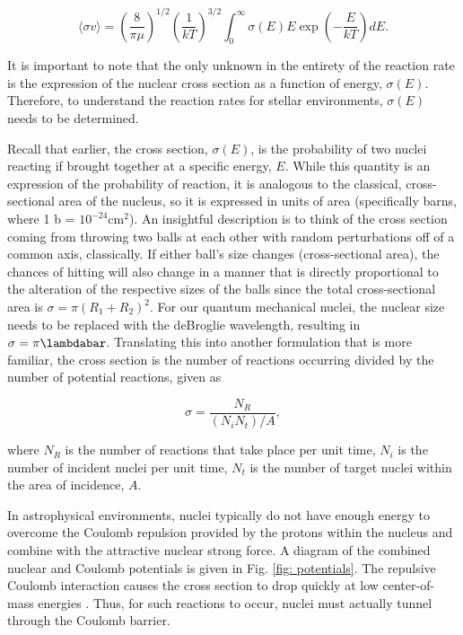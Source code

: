 \begin{equation}
\langle \sigma v \rangle = \left( \frac{8}{\pi \mu} \right) ^{1/2} \left( \frac{1}{kT} \right) ^{3/2} \int_{0}^{\infty} \sigma (E) E \exp \left(-\dfrac{E}{kT} \right) dE.
\label{eqn: rr full}
\end{equation}

\noindent It is important to note that the only unknown in the entirety of the reaction rate is the expression of the nuclear cross section as a function of energy, $\sigma(E)$.  Therefore, to understand the reaction rates for stellar environments, $\sigma(E)$ needs to be determined. 

Recall that earlier, the cross section, $\sigma(E)$, is the probability of two nuclei reacting if brought together at a specific energy, $E$. While this quantity is an expression of the probability of reaction, it is analogous to the classical, cross-sectional area of the nucleus, so it is expressed in units of area (specifically barns, where 1 b = $10^{-24}$cm$^{2}$). An insightful description is to think of the cross section coming from throwing two balls at each other with random perturbations off of a common axis, classically. If either ball's size changes (cross-sectional area), the chances of hitting will also change in a manner that is directly proportional to the alteration of the respective sizes of the balls since the total cross-sectional area is $\sigma = \pi (R_{1} + R_{2})^{2}$. For our quantum mechanical nuclei, the nuclear size needs to be replaced with the deBroglie wavelength, resulting in $\sigma = \pi \lambdabar$. Translating this into another formulation that is more familiar, the cross section is the number of reactions occurring divided by the number of potential reactions, given as

\begin{equation}
\sigma = \dfrac{N_{R}}{(N_{i} N_{t})/A},
\end{equation}

\noindent where $N_{R}$ is the number of reactions that take place per unit time, $N_{i}$ is the number of incident nuclei per unit time, $N_{t}$ is the number of target nuclei within the area of incidence, $A$. 

In astrophysical environments, nuclei typically do not have enough energy to overcome the Coulomb repulsion provided by the protons within the nucleus and combine with the attractive nuclear strong force. A diagram of the combined nuclear and Coulomb potentials is given in Fig. \ref{fig: potentials}. The repulsive Coulomb interaction causes the cross section to drop quickly at low center-of-mass energies \cite{IliadisBook}. Thus, for such reactions to occur, nuclei must actually tunnel through the Coulomb barrier. 

